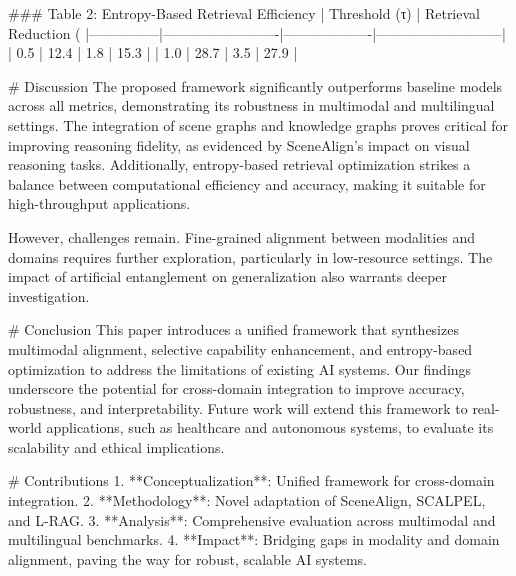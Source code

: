 ### Table 2: Entropy-Based Retrieval Efficiency  
| Threshold (τ) | Retrieval Reduction (%
|---------------|-------------------------|-------------------|---------------------------|
| 0.5           | 12.4                    | 1.8               | 15.3                      |
| 1.0           | 28.7                    | 3.5               | 27.9                      |

# Discussion  
The proposed framework significantly outperforms baseline models across all metrics, demonstrating its robustness in multimodal and multilingual settings. The integration of scene graphs and knowledge graphs proves critical for improving reasoning fidelity, as evidenced by SceneAlign's impact on visual reasoning tasks. Additionally, entropy-based retrieval optimization strikes a balance between computational efficiency and accuracy, making it suitable for high-throughput applications.

However, challenges remain. Fine-grained alignment between modalities and domains requires further exploration, particularly in low-resource settings. The impact of artificial entanglement on generalization also warrants deeper investigation.

# Conclusion  
This paper introduces a unified framework that synthesizes multimodal alignment, selective capability enhancement, and entropy-based optimization to address the limitations of existing AI systems. Our findings underscore the potential for cross-domain integration to improve accuracy, robustness, and interpretability. Future work will extend this framework to real-world applications, such as healthcare and autonomous systems, to evaluate its scalability and ethical implications.

# Contributions  
1. **Conceptualization**: Unified framework for cross-domain integration.  
2. **Methodology**: Novel adaptation of SceneAlign, SCALPEL, and L-RAG.  
3. **Analysis**: Comprehensive evaluation across multimodal and multilingual benchmarks.  
4. **Impact**: Bridging gaps in modality and domain alignment, paving the way for robust, scalable AI systems.